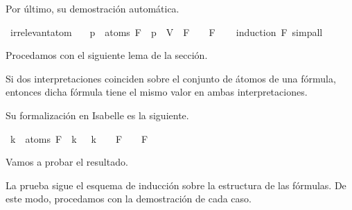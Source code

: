 \begin{isabellebody}
\begin{isamarkuptext}
Por último, su demostración automática.%
\end{isamarkuptext}\isamarkuptrue%
\isamarkupfalse%
\ irrelevant{\isacharunderscore}atom{\isacharcolon}\ \isanewline
\ \ {\isachardoublequoteopen}p\ {\isasymnotin}\ atoms\ F\ {\isasymLongrightarrow}\ {\isacharparenleft}{\isasymA}{\isacharparenleft}p\ {\isacharcolon}{\isacharequal}\ V{\isacharparenright}{\isacharparenright}\ {\isasymTurnstile}\ F\ {\isasymlongleftrightarrow}\ {\isasymA}\ {\isasymTurnstile}\ F{\isachardoublequoteclose}\isanewline
%
\isadelimproof
\ \ %
\endisadelimproof
%
\isatagproof
{}\isamarkupfalse%
\ {\isacharparenleft}induction\ F{\isacharparenright}\ simp{\isacharunderscore}all%
\endisatagproof
{\isafoldproof}%
%
\isadelimproof
%
\endisadelimproof
%
\begin{isamarkuptext}%
Procedamos con el siguiente lema de la sección.

  \begin{lema}
    Si dos interpretaciones coinciden sobre el conjunto de átomos de una 
    fórmula, entonces dicha fórmula tiene el mismo valor en ambas
    interpretaciones. 
  \end{lema}

  Su formalización en Isabelle es la siguiente.%
\end{isamarkuptext}\isamarkuptrue%
\isamarkupfalse%
\ {\isachardoublequoteopen}{\isasymforall}k\ {\isasymin}\ atoms\ F{\isachardot}\ {\isasymA}\ k\ {\isacharequal}\ {\isasymA}\ k\ {\isasymLongrightarrow}\ {\isasymA}\ {\isasymTurnstile}\ F\ {\isasymlongleftrightarrow}\ {\isasymA}\ {\isasymTurnstile}\ F{\isachardoublequoteclose}\isanewline
%
\isadelimproof
\ \ %
\endisadelimproof
%
\isatagproof
{}\isamarkupfalse%
%
\endisatagproof
{\isafoldproof}%
%
\isadelimproof
%
\endisadelimproof
%
\begin{isamarkuptext}%
Vamos a probar el resultado.

  \begin{demostracion}
    La prueba sigue el esquema de inducción sobre la estructura de las
    fórmulas. De este modo, procedamos con la demostración de cada
    caso.


\end{demostracion}
\end{isamarkuptext}
\end{isabellebody}
